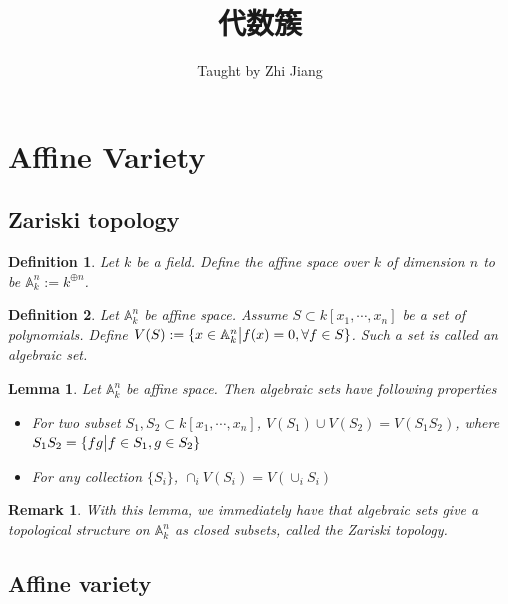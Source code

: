 \documentclass{ctexart}
\title{代数簇}
\author{Taught by Zhi Jiang}
\date{}
\newtheorem{definition}{Definition}[section]
\newtheorem{remark}{Remark}[section]
\newtheorem{lemma}{Lemma}[section]
\begin{document}
\maketitle
\newpage

\tableofcontents
\newpage

\section{Affine Variety}

\subsection{Zariski topology}
\label{subsection:Affine_Variety_Zariski_topology}

\begin{definition}
    Let $k$ be a field.
    Define the affine space over $k$ of dimension $n$ to be $\mathbb{A}_{k}^{n} := k^{\oplus n}$.
\end{definition}
\begin{definition}
    Let $\mathbb{A}_{k}^{n}$ be affine space.
    Assume $S \subset k[x_{1}, \cdots, x_{n}]$ be a set of polynomials.
    Define $V(S) := \{x\in \mathbb{A}_{k}^{n} \big{|} f(x) = 0, \forall f\in S\}$.
    Such a set is called an algebraic set.
\end{definition}
\begin{lemma}
    Let $\mathbb{A}_{k}^{n}$ be affine space.
    Then algebraic sets have following properties 
    \begin{itemize}
        \item For two subset $S_{1}, S_{2} \subset k[x_{1}, \cdots, x_{n}]$, $V(S_{1}) \cup V(S_{2}) = V(S_{1}S_{2})$,
        where $S_{1}S_{2} = \{fg \big{|} f\in S_{1}, g\in S_{2}\}$
        \item For any collection $\{S_{i}\}$, $\cap_{i} V(S_{i}) = V(\cup_{i} S_{i})$
    \end{itemize}
    \label{Lemma 1.1}
\end{lemma}
\vspace{-\baselineskip} %
\begin{remark}
    With this lemma, we immediately have that algebraic sets give a topological structure on $\mathbb{A}_{k}^{n}$ as closed subsets, called the Zariski topology.
\end{remark}

\subsection{Affine variety}
\label{subsection:Affine_Variety_Affine_variety}
\end{document}
